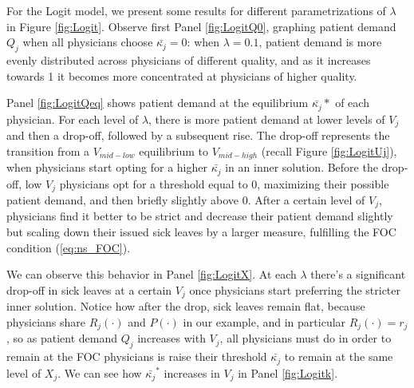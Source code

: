 \documentclass[../main.tex]{subfiles}
\begin{document}
For the Logit model, we present some results for different parametrizations of $\lambda$ in Figure \ref{fig:Logit}. Observe first Panel \ref{fig:LogitQ0}, graphing patient demand $Q_j$ when all physicians choose $\bar{\kappa_j} = 0$: when $\lambda = 0.1$, patient demand is more evenly distributed across physicians of different quality, and as it increases towards 1 it becomes more concentrated at physicians of higher quality.

Panel \ref{fig:LogitQeq} shows patient demand at the equilibrium $\bar{\kappa_j}*$ of each physician. For each level of $\lambda$, there is more patient demand at lower levels of $V_j$ and then a drop-off, followed by a subsequent rise. The drop-off represents the transition from a $V_{mid-low}$ equilibrium to $V_{mid-high}$ (recall Figure \ref{fig:LogitUj}), when physicians start opting for a higher $\bar{\kappa_j}$ in an inner solution. Before the drop-off, low $V_j$ physicians opt for a threshold equal to 0, maximizing their possible patient demand, and then briefly slightly above 0. After a certain level of $V_j$, physicians find it better to be strict and decrease their patient demand slightly but scaling down their issued sick leaves by a larger measure, fulfilling the FOC condition (\ref{eq:ns_FOC}).

We can observe this behavior in Panel \ref{fig:LogitX}. At each $\lambda$ there's a significant drop-off in sick leaves at a certain $V_j$ once physicians start preferring the stricter inner solution. Notice how after the drop, sick leaves remain flat, because physicians share $R_j(\cdot)$ and $P(\cdot)$ in our example, and in particular $R_j(\cdot) = r_j$, so as patient demand $Q_j$ increases with $V_j$, all physicians must do in order to remain at the FOC physicians is raise their threshold $\bar{\kappa_j}$ to remain at the same level of $X_j$. We can see how $\bar{\kappa_j}^*$ increases in $V_j$ in Panel \ref{fig:Logitk}.
\end{document}
